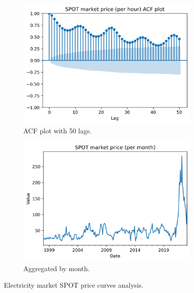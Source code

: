\begin{figure}[H]\ContinuedFloat
    \begin{subfigure}{.45\textwidth}
        \centering
        \includegraphics[width=1\linewidth]{images/variable_analysis/esios_spot_h_acf}
        \caption{ACF plot with 50 lags.}
    \end{subfigure}
    \begin{subfigure}{.45\textwidth}
        \centering
        \includegraphics[width=1\linewidth]{images/variable_analysis/esios_spot_m_omie_all}
        \caption{Aggregated by month.}
    \end{subfigure}

    \caption{Electricity market SPOT price curves analysis.}
    \label{fig:spot-price-series}
\end{figure}

